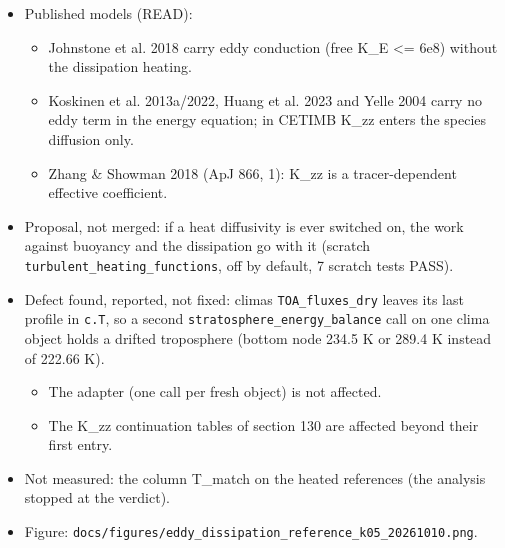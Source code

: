 \documentclass[english,a4paper]{my_memo}
\providecommand{\tightlist}{\setlength{\itemsep}{0pt}\setlength{\parskip}{0pt}}
\begin{document}
\begin{itemize}
  \begin{itemize}
  \tightlist
  \item
    The eddy flux alone ends between 1.0e6 and 1.38e6 cm\^{}2 s\^{}-1 (below
    50 K); with the work against buoyancy alone it ends before 2.79e6.
  \item
    With dissipation a steady T(p) exists to 1e9: T at the match is 345 K
    (dissipation) or 383 K (both terms), and the stratosphere reaches
    650-720 K.
  \item
    At 1e9 the turbulent heating is 4.2e8-5.3e8 erg cm\^{}-2 s\^{}-1: 790-1000
    times the absorbed stellar flux (5.36e5). It is conducted into the held
    troposphere, and OLR - ASR = 3.5e6-6.4e6.
  \item
    The heating passes the absorbed stellar flux at K \textasciitilde{} 1.2e6.
  \item
    Verdict: K\_zz = 1e9 cannot be a local stably stratified turbulence (no
    energy source of that size). It is an effective tracer coefficient, and
    \texttt{-\/-eddy-heat-transport\ off} stays.
  \end{itemize}
\item
  Published models (READ):

  \begin{itemize}
  \tightlist
  \item
    Johnstone et al. 2018 carry eddy conduction (free K\_E \textless= 6e8) without
    the dissipation heating.
  \item
    Koskinen et al. 2013a/2022, Huang et al. 2023 and Yelle 2004 carry no
    eddy term in the energy equation; in CETIMB K\_zz enters the species
    diffusion only.
  \item
    Zhang \& Showman 2018 (ApJ 866, 1): K\_zz is a tracer-dependent effective
    coefficient.
  \end{itemize}
\item
  Proposal, not merged: if a heat diffusivity is ever switched on, the work
  against buoyancy and the dissipation go with it (scratch
  \texttt{turbulent\_heating\_functions}, off by default, 7 scratch tests PASS).
\item
  Defect found, reported, not fixed: clima\textquotesingle s \texttt{TOA\_fluxes\_dry} leaves its
  last profile in \texttt{c.T}, so a second \texttt{stratosphere\_energy\_balance} call on
  one clima object holds a drifted troposphere (bottom node 234.5 K or
  289.4 K instead of 222.66 K).

  \begin{itemize}
  \tightlist
  \item
    The adapter (one call per fresh object) is not affected.
  \item
    The K\_zz continuation tables of section 130 are affected beyond their
    first entry.
  \end{itemize}
\item
  Not measured: the column T\_match on the heated references (the analysis
  stopped at the verdict).
\item
  Figure: \texttt{docs/figures/eddy\_dissipation\_reference\_k05\_20261010.png}.
\end{itemize}
\end{document}
